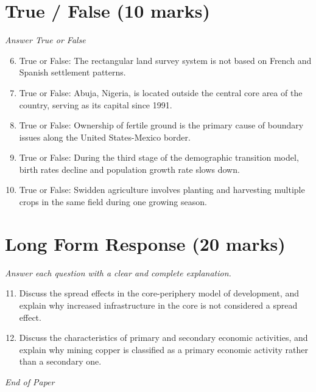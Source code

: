 \documentclass[12pt]{article}
\begin{document}
\section*{True / False (10 marks)}
\textit{Answer True or False}
\begin{enumerate}[label=\arabic*.]
\setcounter{enumi}{5}
\item True or False: The rectangular land survey system is not based on French and Spanish settlement patterns.
\item True or False: Abuja, Nigeria, is located outside the central core area of the country, serving as its capital since 1991.
\item True or False: Ownership of fertile ground is the primary cause of boundary issues along the United States-Mexico border.
\item True or False: During the third stage of the demographic transition model, birth rates decline and population growth rate slows down.
\item True or False: Swidden agriculture involves planting and harvesting multiple crops in the same field during one growing season.
\end{enumerate}

\section*{Long Form Response (20 marks)}
\textit{Answer each question with a clear and complete explanation.}
\begin{enumerate}[label=\arabic*.]
\setcounter{enumi}{10}
\item Discuss the spread effects in the core-periphery model of development, and explain why increased infrastructure in the core is not considered a spread effect.
\item Discuss the characteristics of primary and secondary economic activities, and explain why mining copper is classified as a primary economic activity rather than a secondary one.
\end{enumerate}

\vfill
\noindent\textit{End of Paper}
\end{document}

